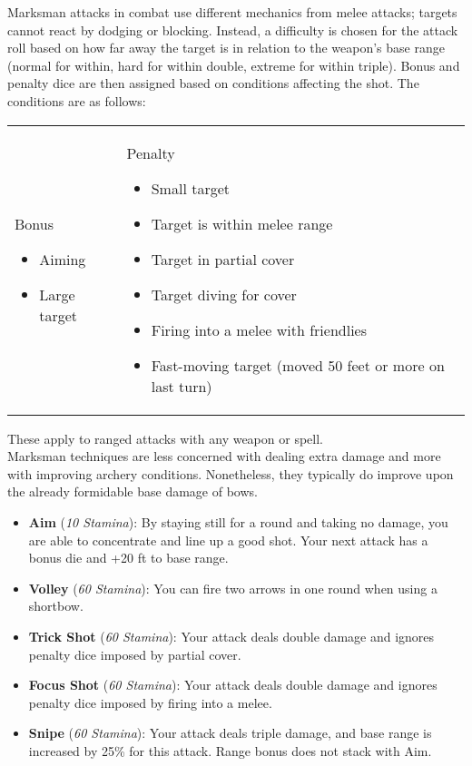 Marksman attacks in combat use different mechanics from melee attacks; targets cannot react by dodging or blocking. Instead, a difficulty is chosen for the attack roll based on how far away the target is in relation to the weapon's base range (normal for within, hard for within double, extreme for within triple). Bonus and penalty dice are then assigned based on conditions affecting the shot. The conditions are as follows:

\begin{center}
\begin{tabular}{p{}p{}}
	Bonus
	\begin{itemize}
		\item Aiming
		\item Large target
	\end{itemize}
	&
	Penalty
	\begin{itemize}
		\item Small target
		\item Target is within melee range
		\item Target in partial cover
		\item Target diving for cover
		\item Firing into a melee with friendlies
		\item Fast-moving target (moved 50 feet or more on last turn)
	\end{itemize}\\
\end{tabular}
\end{center}

These apply to ranged attacks with any weapon or spell.\\

Marksman techniques are less concerned with dealing extra damage and more with improving archery conditions. Nonetheless, they typically do improve upon the already formidable base damage of bows.

\begin{itemize}
	\item \textbf{Aim} (\textit{10 Stamina}): By staying still for a round and taking no damage, you are able to concentrate and line up a good shot. Your next attack has a bonus die and +20 ft to base range.
	\item \textbf{Volley} (\textit{60 Stamina}): You can fire two arrows in one round when using a shortbow.
	\item \textbf{Trick Shot} (\textit{60 Stamina}): Your attack deals double damage and ignores penalty dice imposed by partial cover.
	\item \textbf{Focus Shot} (\textit{60 Stamina}): Your attack deals double damage and ignores penalty dice imposed by firing into a melee.
	\item \textbf{Snipe} (\textit{60 Stamina}): Your attack deals triple damage, and base range is increased by 25\% for this attack. Range bonus does not stack with Aim.
\end{itemize}

